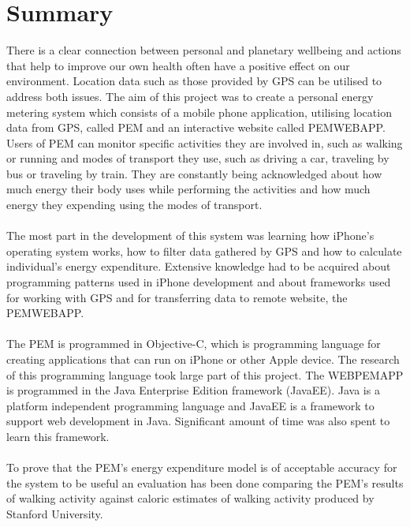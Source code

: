 \documentclass[12pt, a4paper]{report}   %
\begin{document}
\section*{Summary}
There is a clear connection between personal and planetary wellbeing and actions that help to improve our own health often have a positive effect on our environment. Location data such as those provided by GPS can be utilised to address both issues. The aim of this project was to create a personal energy metering system which consists of a mobile phone application, utilising location data from GPS, called PEM and an interactive website called PEMWEBAPP. Users of PEM can monitor specific activities they are involved in, such as walking or running and modes of transport they use, such as driving a car, traveling by bus or traveling by train. They are constantly being acknowledged about how much energy their body uses while performing the activities and how much energy they expending using the modes of transport.\\ \\
The most part in the development of this system was learning how iPhone's operating system works, how to filter data gathered by GPS and how to calculate individual's energy expenditure. Extensive knowledge had to be acquired about programming patterns used in iPhone development and about frameworks used for working with GPS and for transferring data to remote website, the PEMWEBAPP.\\ \\
The PEM is programmed in Objective-C, which is programming language for creating applications that can run on iPhone or other Apple device. The research of this programming language took large part of this project.
The WEBPEMAPP is programmed in the Java Enterprise Edition framework (JavaEE). Java is a platform independent programming language and JavaEE is a framework to support web development in Java. Significant amount of time was also spent to learn this framework.\\ \\
To prove that the PEM's energy expenditure model is of acceptable accuracy for the system to be useful an evaluation has been done comparing the PEM's results of walking activity against caloric estimates of walking activity produced by Stanford University.


\tableofcontents
\thispagestyle{empty}


\clearpage
{}
\end{document}

